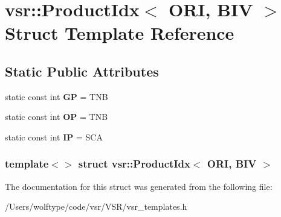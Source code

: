 \hypertarget{structvsr_1_1_product_idx_3_01_o_r_i_00_01_b_i_v_01_4}{\section{vsr\-:\-:Product\-Idx$<$ O\-R\-I, B\-I\-V $>$ Struct Template Reference}
\label{structvsr_1_1_product_idx_3_01_o_r_i_00_01_b_i_v_01_4}
}
\subsection*{Static Public Attributes}
\begin{DoxyCompactItemize}
\item 
\hypertarget{structvsr_1_1_product_idx_3_01_o_r_i_00_01_b_i_v_01_4_a8e38edf9ddb570af693c738313d064c6}{static const int {\bfseries G\-P} = T\-N\-B}\label{structvsr_1_1_product_idx_3_01_o_r_i_00_01_b_i_v_01_4_a8e38edf9ddb570af693c738313d064c6}

\item 
\hypertarget{structvsr_1_1_product_idx_3_01_o_r_i_00_01_b_i_v_01_4_a082e0a7ea5f523a0d1e7cc5142f604d7}{static const int {\bfseries O\-P} = T\-N\-B}\label{structvsr_1_1_product_idx_3_01_o_r_i_00_01_b_i_v_01_4_a082e0a7ea5f523a0d1e7cc5142f604d7}

\item 
\hypertarget{structvsr_1_1_product_idx_3_01_o_r_i_00_01_b_i_v_01_4_a0af552e6514cad7c2a1fd92d20074112}{static const int {\bfseries I\-P} = S\-C\-A}\label{structvsr_1_1_product_idx_3_01_o_r_i_00_01_b_i_v_01_4_a0af552e6514cad7c2a1fd92d20074112}

\end{DoxyCompactItemize}
\subsubsection*{template$<$$>$ struct vsr\-::\-Product\-Idx$<$ O\-R\-I, B\-I\-V $>$}



The documentation for this struct was generated from the following file\-:\begin{DoxyCompactItemize}
\item 
/\-Users/wolftype/code/vsr/\-V\-S\-R/vsr\-\_\-templates.\-h\end{DoxyCompactItemize}
